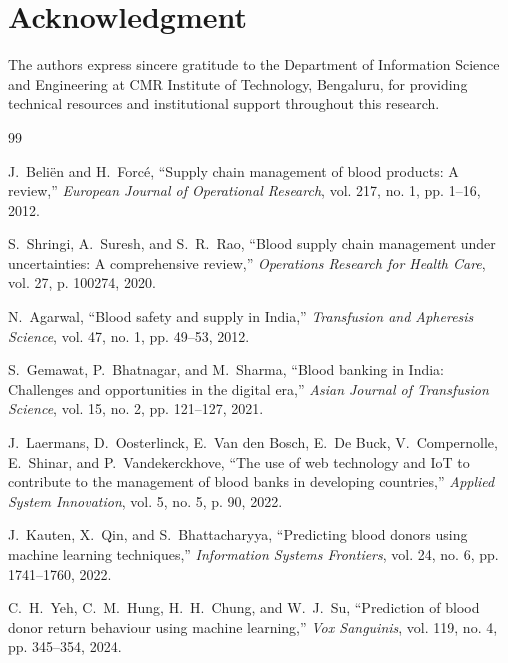 \documentclass[conference]{IEEEtran}
\begin{document}
\section*{Acknowledgment}
The authors express sincere gratitude to the Department of Information Science and Engineering at CMR Institute of Technology, Bengaluru, for providing technical resources and institutional support throughout this research.

\begin{thebibliography}{99}

J.~Beli{\"e}n and H.~Forc{\'e}, ``Supply chain management of blood products: A review,'' \textit{European Journal of Operational Research}, vol. 217, no. 1, pp. 1--16, 2012.

S.~Shringi, A.~Suresh, and S.~R.~Rao, ``Blood supply chain management under uncertainties: A comprehensive review,'' \textit{Operations Research for Health Care}, vol. 27, p. 100274, 2020.

N.~Agarwal, ``Blood safety and supply in India,'' \textit{Transfusion and Apheresis Science}, vol. 47, no. 1, pp. 49--53, 2012.

S.~Gemawat, P.~Bhatnagar, and M.~Sharma, ``Blood banking in India: Challenges and opportunities in the digital era,'' \textit{Asian Journal of Transfusion Science}, vol. 15, no. 2, pp. 121--127, 2021.

J.~Laermans, D.~Oosterlinck, E.~Van den Bosch, E.~De Buck, V.~Compernolle, E.~Shinar, and P.~Vandekerckhove, ``The use of web technology and IoT to contribute to the management of blood banks in developing countries,'' \textit{Applied System Innovation}, vol. 5, no. 5, p. 90, 2022.

J.~Kauten, X.~Qin, and S.~Bhattacharyya, ``Predicting blood donors using machine learning techniques,'' \textit{Information Systems Frontiers}, vol. 24, no. 6, pp. 1741--1760, 2022.

C.~H.~Yeh, C.~M.~Hung, H.~H.~Chung, and W.~J.~Su, ``Prediction of blood donor return behaviour using machine learning,'' \textit{Vox Sanguinis}, vol. 119, no. 4, pp. 345--354, 2024.


\end{thebibliography}
\end{document}
